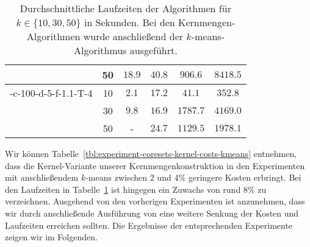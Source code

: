 \begin{table}[h]
\begin{tabular}{@{}cccccc@{}}
		 						& 50 & $18.9$ 			& $40.8$ 			& $906.6$ 				& $8418.5$ \\
	\midrule
	\KCsTwo-c-100-d-5-f-1.1-T-4	& 10 & $2.1$ 			& $17.2$ 			& $41.1$ 				& $352.8$ \\
			 					& 30 & $9.8$ 			& $16.9$			& $1787.7$ 				& $4169.0$ \\
		 						& 50 & - 				& $24.7$ 			& $1129.5$ 				& $1978.1$ \\
	\bottomrule
\end{tabular}
\caption{Durchschnittliche Laufzeiten der Algorithmen für $k \in \{ 10, 30, 50 \}$ in Sekunden. Bei den Kernmengen-Algorithmen
wurde anschließend der $k$-means-Algorithmus ausgeführt.}
\label{tbl:experiment-coresets-kernel-runtime-kmeans}
\end{table}
Wir können Tabelle~\ref{tbl:experiment-coresets-kernel-costs-kmeans} entnehmen, dass die Kernel-Variante unserer
Kernmengenkonstruktion in den Experimenten mit anschließendem $k$-means zwischen 2 und 4\% geringere Kosten erbringt. Bei den
Laufzeiten in Tabelle~\ref{tbl:experiment-coresets-kernel-runtime-kmeans} ist hingegen ein Zuwachs von rund 8\% zu verzeichnen.
Ausgehend von den vorherigen Experimenten ist anzunehmen, dass wir durch anschließende Ausführung von \kmpp{} eine
weitere Senkung der Kosten und Laufzeiten erreichen sollten. Die Ergebnisse der entsprechenden Experimente zeigen wir im Folgenden.
\newpage
